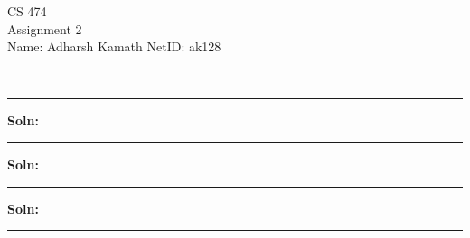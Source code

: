\documentclass[12pt,letterpaper, onecolumn]{exam}
\begin{document}
\begingroup
\centering
\LARGE CS 474\\
\large Assignment 2 \\[0.5em]
\endgroup
\begingroup
\normalsize \quad\quad\quad Name: Adharsh Kamath \quad\quad\quad  NetID: ak128 \par\
\endgroup
\rule{17cm}{0.4pt}
\pointsdroppedatright   %
\printanswers
\renewcommand{\solutiontitle}{\noindent\textbf{Soln:}\enspace}
\newcommand{\cheading}[1]{{\underline{\textit{#1}}}}

\renewcommand{\questionshook}{%
	\setlength{\leftmargin}{18pt}%
	\setlength{\labelwidth}{-\labelsep}%
}
\begin{questions}
	\question[]
	\solutiontitle

    {\rule{17cm}{0.4pt}}
	\question[]
	\solutiontitle

    {\rule{17cm}{0.4pt}}
	\question[]
	\solutiontitle

    {\rule{17cm}{0.4pt}}

\end{questions}
\end{document}
